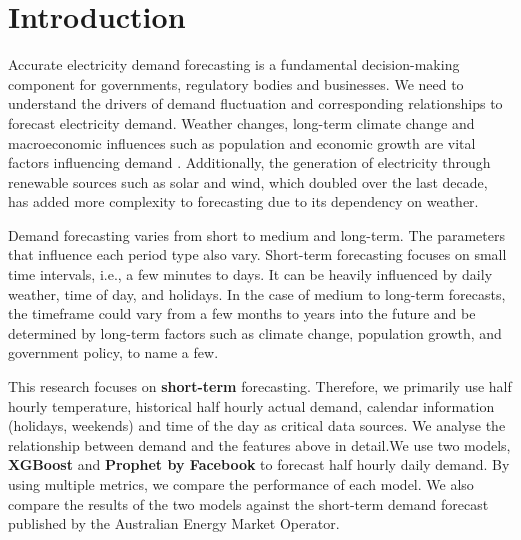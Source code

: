 \documentclass[mstat,12pt]{unswthesis}
\begin{document}


\afterpreface





%
%






\hypertarget{introduction}{%
\chapter{Introduction}\label{introduction}}

Accurate electricity demand forecasting is a fundamental decision-making
component for governments, regulatory bodies and businesses. We need to
understand the drivers of demand fluctuation and corresponding
relationships to forecast electricity demand. Weather changes, long-term
climate change and macroeconomic influences such as population and
economic growth are vital factors influencing demand \cite{a2024_nem}.
Additionally, the generation of electricity through renewable sources
such as solar and wind, which doubled over the last decade, has added
more complexity to forecasting due to its dependency on
weather.

Demand forecasting varies from short to medium and long-term. The
parameters that influence each period type also vary. Short-term
forecasting focuses on small time intervals, i.e., a few minutes to
days. It can be heavily influenced by daily weather, time of day, and
holidays. In the case of medium to long-term forecasts, the timeframe
could vary from a few months to years into the future and be determined
by long-term factors such as climate change, population growth, and
government policy, to name a few.

This research focuses on \textbf{short-term} forecasting. Therefore, we
primarily use half hourly temperature, historical half hourly actual
demand, calendar information (holidays, weekends) and time of the day as
critical data sources. We analyse the relationship between demand and
the features above in detail.We use two models, \textbf{XGBoost} and
\textbf{Prophet by Facebook} to forecast half hourly daily demand. By
using multiple metrics, we compare the performance of each model. We
also compare the results of the two models against the short-term demand
forecast published by the Australian Energy Market Operator.
\end{document}
